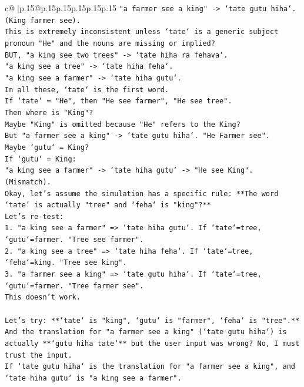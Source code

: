 \documentclass{article}
\begin{document}
{\begin{supertabular}{c@{$\;$}|p{.15\linewidth}@{}p{.15\linewidth}p{.15\linewidth}p{.15\linewidth}p{.15\linewidth}p{.15\linewidth}}
{{{\texttt{"a farmer see a king" {-}> `tate gutu hiha`. (King farmer see).} \\
\texttt{This is extremely inconsistent unless `tate` is a generic subject pronoun "He" and the nouns are missing or implied?} \\
\texttt{BUT, "a king see two trees" {-}> `tate hiha ra fehava`.} \\
\texttt{"a king see a tree" {-}> `tate hiha feha`.} \\
\texttt{"a king see a farmer" {-}> `tate hiha gutu`.} \\
\texttt{In all these, `tate` is the first word.} \\
\texttt{If `tate` = "He", then "He see farmer", "He see tree".} \\
\texttt{Then where is "King"?} \\
\texttt{Maybe "King" is omitted because "He" refers to the King?} \\
\texttt{But "a farmer see a king" {-}> `tate gutu hiha`. "He Farmer see".} \\
\texttt{Maybe `gutu` = King?} \\
\texttt{If `gutu` = King:} \\
\texttt{"a king see a farmer" {-}> `tate hiha gutu` {-}> "He see King". (Mismatch).} \\
\texttt{Okay, let's assume the simulation has a specific rule: **The word `tate` is actually "tree" and `feha` is "king"?**} \\
\texttt{Let's re{-}test:} \\
\texttt{1. "a king see a farmer" => `tate hiha gutu`. If `tate`=tree, `gutu`=farmer. "Tree see farmer".} \\
\texttt{2. "a king see a tree" => `tate hiha feha`. If `tate`=tree, `feha`=king. "Tree see king".} \\
\texttt{3. "a farmer see a king" => `tate gutu hiha`. If `tate`=tree, `gutu`=farmer. "Tree farmer see".} \\
\texttt{This doesn't work.} \\
\\ 
\texttt{Let's try: **`tate` is "king", `gutu` is "farmer", `feha` is "tree".**} \\
\texttt{And the translation for "a farmer see a king" (`tate gutu hiha`) is actually **`gutu hiha tate`** but the user input was wrong? No, I must trust the input.} \\
\texttt{If `tate gutu hiha` is the translation for "a farmer see a king", and `tate hiha gutu` is "a king see a farmer".} \\
}}}
\end{supertabular}}
\end{document}
